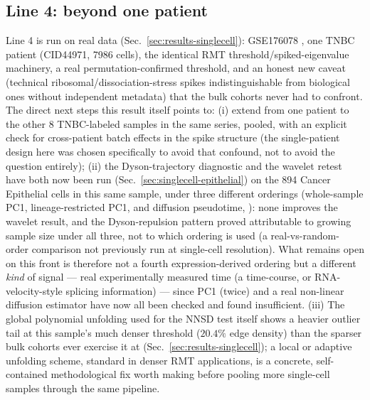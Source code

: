 \documentclass[11pt]{article}
\begin{document}
\subsection{Line 4: beyond one patient}
Line 4 is run on real data (Sec.~\ref{sec:results-singlecell}):
GSE176078 \citep{tnbcsc2021}, one TNBC patient (CID44971, 7986 cells),
the identical RMT threshold/spiked-eigenvalue machinery, a real
permutation-confirmed threshold, and an honest new caveat (technical
ribosomal/dissociation-stress spikes indistinguishable from biological
ones without independent metadata) that the bulk cohorts never had to
confront. The direct next steps this result itself points to: (i)
extend from one patient to the other 8 TNBC-labeled samples in the same
series, pooled, with an explicit check for cross-patient batch effects
in the spike structure (the single-patient design here was chosen
specifically to avoid that confound, not to avoid the question
entirely); (ii) the Dyson-trajectory diagnostic and the wavelet retest
have both now been run (Sec.~\ref{sec:singlecell-epithelial}) on the
894 Cancer Epithelial cells in this same sample, under three different
orderings (whole-sample PC1, lineage-restricted PC1, and diffusion
pseudotime, \citealp{haghverdi2016}): none improves the wavelet result,
and the Dyson-repulsion pattern proved attributable to growing sample
size under all three, not to which ordering is used (a real-vs-random-
order comparison not previously run at single-cell resolution). What
remains open on this front is therefore not a fourth expression-derived
ordering but a different \emph{kind} of signal ---
real experimentally measured time (a time-course, or RNA-velocity-style
splicing information) --- since PC1 (twice) and a real non-linear
diffusion estimator have now all been checked and found insufficient.
(iii) The global polynomial unfolding
used for the NNSD test itself shows a heavier outlier tail at this
sample's much denser threshold ($20.4\%$ edge density) than the sparser
bulk cohorts ever exercise it at (Sec.~\ref{sec:results-singlecell}); a
local or adaptive unfolding scheme, standard in denser RMT applications,
is a concrete, self-contained methodological fix worth making before
pooling more single-cell samples through the same pipeline.
\end{document}
